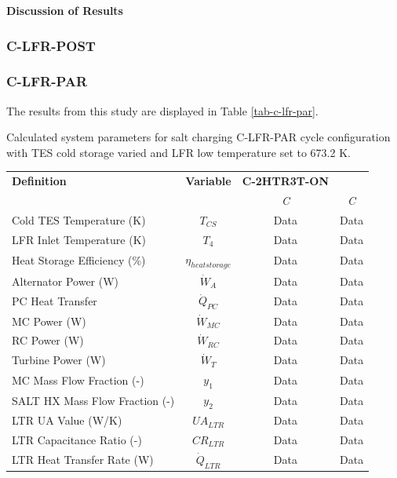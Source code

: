 \begin{paracol}{2}
\textbf{Discussion of Results}


\subsubsection{C-LFR-POST}


\subsubsection{C-LFR-PAR}

The results from this study are displayed in Table \ref{tab-c-lfr-par}.

\begin{specialtable}[H]
    \caption{Calculated system parameters for salt charging C-LFR-PAR cycle configuration with TES cold storage varied and LFR low temperature set to 673.2 K.\label{tab-c-lfr-par}}
    \begin{tabular}{lccc}
    \toprule
    \textbf{Definition} & \textbf{Variable} & \textbf{C-2HTR3T-ON} & \\
    & & \textit{C} & \textit{C}\\
    \midrule	
    Cold TES Temperature (K)	&	$T_{CS}$	&	Data	&	Data	\\
    LFR Inlet Temperature (K)	&	$T_{4}$	&	Data	&	Data	\\
    Heat Storage Efficiency (\%)	&	$\eta_{heatstorage}$	&	Data	&	Data	\\
    Alternator Power (W)	&	$\dot{W}_{A}$	&	Data	&	Data	\\
    PC Heat Transfer	&	$\dot{Q}_{PC}$	&	Data	&	Data	\\
    MC Power (W)	&	$\dot{W}_{MC}$	&	Data	&	Data	\\
    RC Power (W)	&	$\dot{W}_{RC}$	&	Data	&	Data	\\
    Turbine Power (W)	&	$\dot{W}_{T}$	&	Data	&	Data	\\
    MC Mass Flow Fraction (-)	&	$y_{1}$	&	Data	&	Data	\\
    SALT HX Mass Flow Fraction (-)	&	$y_{2}$	&	Data	&	Data	\\
    LTR UA Value (W/K)	&	$UA_{LTR}$	&	Data	&	Data	\\
    LTR Capacitance Ratio (-)	&	$CR_{LTR}$	&	Data	&	Data	\\
    LTR Heat Transfer Rate (W)	&	$\dot{Q}_{LTR}$	&	Data	&	Data	\\

\end{tabular}
\end{specialtable}
\end{paracol}
